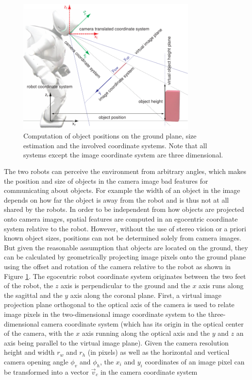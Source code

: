 \begin{figure}[t]
  \includegraphics[width=0.8\textwidth]{figures/vision-system-coordinate-systems}
  \caption{Computation of object positions on the ground plane, size
    estimation and the involved coordinate systems. Note that all
    systems except the image coordinate system are three
    dimensional. }
  \label{f:vision-system-coordinate-systems}
\end{figure}


The two robots can perceive the environment from arbitrary angles,
which makes the position and size of objects in the camera image bad
features for communicating about objects. For example the width of an
object in the image depends on how far the object is away from the
robot and is thus not at all shared by the robots. In order to be
independent from how objects are projected onto camera images, spatial
features are computed in an egocentric coordinate system relative to
the robot. However, without the use of stereo vision or a priori known
object sizes, positions can not be determined solely from camera
images. But given the reasonable assumption that objects are located
on the ground, they can be calculated by geometrically projecting
image pixels onto the ground plane using the offset and rotation of
the camera relative to the robot as shown in Figure
\ref{f:vision-system-coordinate-systems}. The egocentric robot
coordinate system originates between the two feet of the robot, the
$z$ axis is perpendicular to the ground and the $x$ axis runs along
the sagittal and the $y$ axis along the coronal plane. First, a
virtual image projection plane orthogonal to the optical axis of the
camera is used to relate image pixels in the two-dimensional image
coordinate system to the three-dimensional camera coordinate system
(which has its origin in the optical center of the camera, with the
$x$ axis running along the optical axis and the $y$ and $z$ an axis
being parallel to the virtual image plane). Given the camera
resolution height and width $r_{w}$ and $r_{h}$ (in pixels) as well as
the horizontal and vertical camera opening angle $\phi_{v}$ and
$\phi_{h}$, the $x_i$ and $y_i$ coordinates of an image pixel can be
transformed into a vector $\vec{v}_c$ in the camera coordinate system

